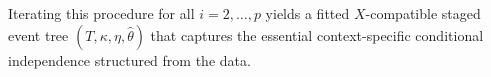 \documentclass[preprint,12pt]{elsarticle}
\newcommand{\blue}{\color{blue}}
\begin{document}
Iterating this procedure for all $i = 2, \dots, p$ yields a fitted 
$X$-compatible staged event tree $(T, \kappa, \eta, \hat{\theta})$ that captures 
the essential context-specific conditional independence structured from the data.




\end{document}
